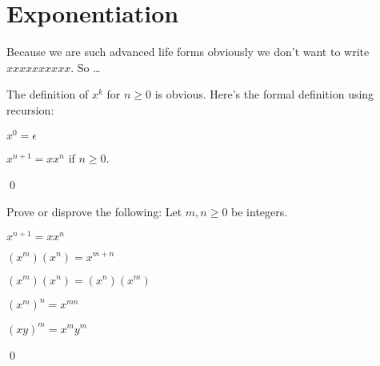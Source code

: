 \section{Exponentiation}

 Because we are such advanced life forms obviously we don't want
 to write $xxxxxxxxxx$. So \ldots

 \begin{defn}  
 The definition of $x^k$ for $n \geq 0$ is obvious.
 Here's the formal definition using recursion:
 \begin{tightlist}
  \item $x^0 = \epsilon$
  \item $x^{n+1} = x x^n$ if $n \geq 0$.
 \end{tightlist}
 \qed
\end{defn}

 \newpage
 \begin{ex}
   Prove or disprove the following:
   Let $m,n \geq 0$ be integers.
   \begin{tightlist}
   \item $x^{n + 1} = x x^n$
   \item $(x^m)(x^n) = x^{m+n}$
   \item $(x^m)(x^n) = (x^n)(x^m)$
   \item $(x^m)^n = x^{mn}$
   \item $(xy)^m = x^m y^m$
   \end{tightlist}
   \qed
 \end{ex}
 

